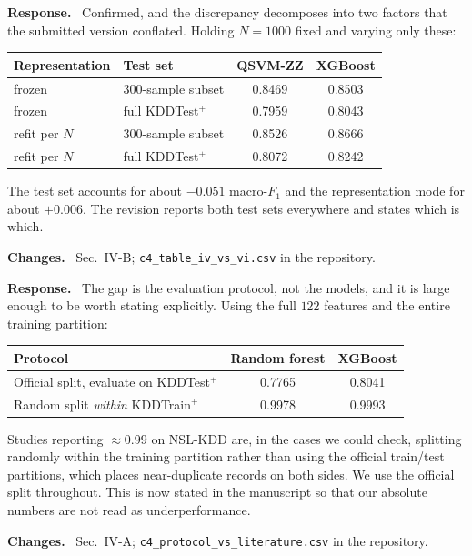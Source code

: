 \documentclass[11pt,a4paper]{article}
\newcommand{\itemhead}[2]{%
  \par\addvspace{15pt}%
  \noindent{\bfseries\color{tagink}#1}\hspace{0.7em}{\bfseries #2}%
  \par\addvspace{3.5pt}%
  \noindent{\color{rulegray}\rule{\linewidth}{0.5pt}}%
  \par\addvspace{5pt}%
  \nobreak}
\newcommand{\resp}{\par\addvspace{2pt}\noindent\textbf{Response.}\ }
\newcommand{\changed}{\par\addvspace{5pt}\noindent
  {\bfseries\color{tagink}Changes.}\ }
\begin{document}
\itemhead{R1-8}{Table~VI ($N=1000$) inconsistent with Table~IV}
\resp
Confirmed, and the discrepancy decomposes into two factors that the submitted
version conflated. Holding $N=1000$ fixed and varying only these:

\begin{center}
\small
\begin{tabular}{@{}llcc@{}}
\toprule
Representation & Test set & QSVM-ZZ & XGBoost \\
\midrule
frozen        & 300-sample subset & 0.8469 & 0.8503 \\
frozen        & full KDDTest$^{+}$ & 0.7959 & 0.8043 \\
refit per $N$ & 300-sample subset & 0.8526 & 0.8666 \\
refit per $N$ & full KDDTest$^{+}$ & 0.8072 & 0.8242 \\
\bottomrule
\end{tabular}
\end{center}

The test set accounts for about $-0.051$ macro-$F_1$ and the representation mode
for about $+0.006$. The revision reports both test sets everywhere and states
which is which.
\changed
Sec.~IV-B; \texttt{c4\_table\_iv\_vs\_vi.csv} in the repository.

\itemhead{R1-9}{Classical $F_1$ low relative to values commonly reported on
NSL-KDD}
\resp
The gap is the evaluation protocol, not the models, and it is large enough to be
worth stating explicitly. Using the full $122$ features and the entire training
partition:

\begin{center}
\small
\begin{tabular}{@{}lcc@{}}
\toprule
Protocol & Random forest & XGBoost \\
\midrule
Official split, evaluate on KDDTest$^{+}$ & 0.7765 & 0.8041 \\
Random split \emph{within} KDDTrain$^{+}$ & 0.9978 & 0.9993 \\
\bottomrule
\end{tabular}
\end{center}

Studies reporting $\approx0.99$ on NSL-KDD are, in the cases we could check,
splitting randomly within the training partition rather than using the official
train/test partitions, which places near-duplicate records on both sides. We use
the official split throughout. This is now stated in the manuscript so that our
absolute numbers are not read as underperformance.
\changed
Sec.~IV-A; \texttt{c4\_protocol\_vs\_literature.csv} in the repository.
\end{document}
